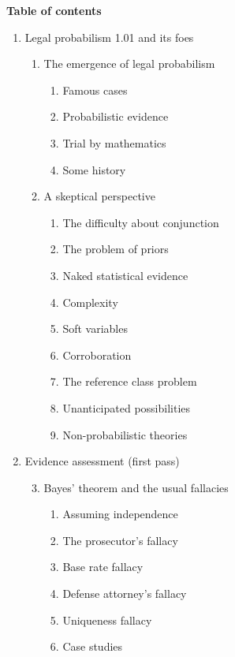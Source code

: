 \documentclass[
  10pt,
  dvipsnames,enabledeprecatedfontcommands]{scrartcl}
\begin{document}
\begin{center}\textbf{\large Table of contents}\end{center}
\begin{multicols}{2}
\footnotesize

\renewcommand{\labelenumi}{\Roman{enumi}}
\renewcommand{\labelenumii}{\arabic{enumii}}
\renewcommand{\labelenumiii}{\arabic{enumii}.\arabic{enumiii}}

\begin{enumerate}
\item Legal probabilism 1.01 and its foes
\begin{enumerate}

  \item The emergence of legal probabilism
  \begin{enumerate}
  \item  Famous cases
  \item  Probabilistic evidence
  \item  Trial by mathematics
  \item  Some history
  \end{enumerate}
  

  
  \item  A skeptical perspective
  \begin{enumerate}
  \item  The difficulty about conjunction
  \item  The problem of priors
  \item  Naked statistical evidence
  \item  Complexity
  \item  Soft variables
  \item  Corroboration
  \item  The reference class problem
  \item  Unanticipated possibilities
  \item  Non-probabilistic theories
  \end{enumerate}


\end{enumerate}
\item  Evidence assessment (first pass)


\begin{enumerate}


\setcounter{enumii}{2}
  \item  Bayes' theorem and the usual fallacies
  \begin{enumerate}
  \item  Assuming independence
  \item  The prosecutor's fallacy
  \item  Base rate fallacy
  \item  Defense attorney's fallacy
  \item  Uniqueness fallacy
  \item  Case studies
  \end{enumerate}


\end{enumerate}
\end{enumerate}
\end{multicols}
\end{document}
